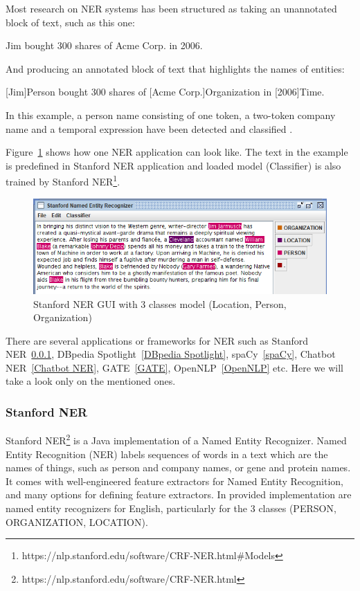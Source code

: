 \documentclass[thesis=M,english]{FITthesis}[2018/05/30]
\begin{document}
Most research on NER systems has been structured as taking an unannotated block of text, such as this one:

Jim bought 300 shares of Acme Corp. in 2006.

And producing an annotated block of text that highlights the names of entities:

[Jim]Person bought 300 shares of [Acme Corp.]Organization in [2006]Time.

In this example, a person name consisting of one token, a two-token company name and a temporal expression have been detected and classified \cite{wiki:NER}.

	Figure~\ref{fig:StanfordNER} shows how one NER application can look like. The text in the example is predefined in Stanford NER application and loaded model (Classifier) is also trained by Stanford NER\footnote{https://nlp.stanford.edu/software/CRF-NER.html\#Models}.

	\begin{figure}[H]\centering
		\includegraphics[width=\textwidth]{NER-Stanford}
		\caption{Stanford NER GUI with 3 classes model (Location, Person, Organization)}\label{fig:StanfordNER}
	\end{figure}

	There are several applications or frameworks for NER such as Stanford NER~\ref{Stanford NER}, DBpedia Spotlight~\ref{DBpedia Spotlight}, spaCy~\ref{spaCy}, Chatbot NER~\ref{Chatbot NER}, GATE~\ref{GATE}, OpenNLP~\ref{OpenNLP} etc. Here we will take a look only on the mentioned ones.

\subsubsection{Stanford NER}\label{Stanford NER}
Stanford NER\footnote{https://nlp.stanford.edu/software/CRF-NER.html} is a Java implementation of a Named Entity Recognizer. Named Entity Recognition (NER) labels sequences of words in a text which are the names of things, such as person and company names, or gene and protein names. It comes with well-engineered feature extractors for Named Entity Recognition, and many options for defining feature extractors. In provided implementation are named entity recognizers for English, particularly for the 3 classes (PERSON, ORGANIZATION, LOCATION).
\end{document}
